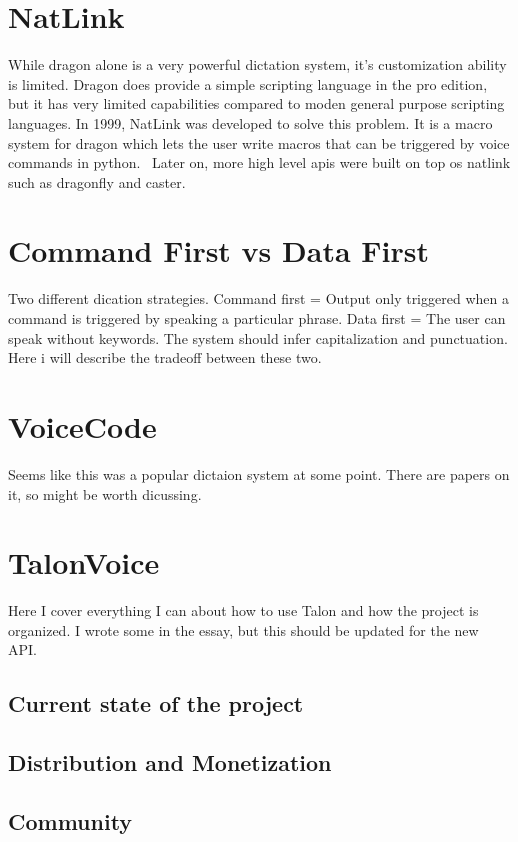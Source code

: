\documentclass[a4paper,english]{ifimaster}
\begin{document}
\section{NatLink}
While dragon alone is a very powerful dictation system, it's customization ability is limited.
Dragon does provide a simple scripting language in the pro edition, but it has very limited capabilities compared to
moden general purpose scripting languages.
In 1999, NatLink was developed to solve this problem. It is a macro system for dragon which lets the user write macros that can be triggered by voice commands
in python.~\parencite{gould2001implementation}
Later on, more high level apis were built on top os natlink such as dragonfly and caster. %

\section{Command First vs Data First}
Two different dication strategies.
Command first = Output only triggered when a command is triggered by speaking a particular phrase.
Data first = The user can speak without keywords. The system should infer capitalization and punctuation.
Here i will describe the tradeoff between these two.

\section{VoiceCode}
Seems like this was a popular dictaion system at some point. There are papers on it, so might be worth dicussing.


\section{TalonVoice}
Here I cover everything I can about how to use Talon and how the project is organized.
I wrote some in the essay, but this should be updated for the new API.

\subsection{Current state of the project}
\subsection{Distribution and Monetization}
\subsection{Community}
\end{document}
